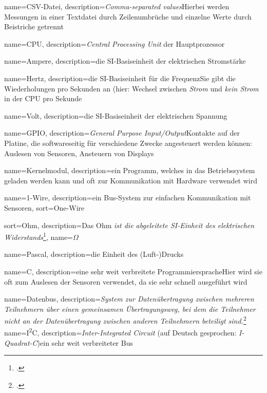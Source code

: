 {
  name=CSV-Datei,
  description={\textit{Comma-separated values}\newline Hierbei werden Messungen in einer Textdatei durch Zeilenumbrüche und einzelne Werte durch Beistriche getrennt}
}

{
  name=CPU,
  description={\textit{Central Processing Unit}\newline
  	der Hauptprozessor}
}

{
  name=Ampere,
  description={die SI-Basiseinheit der elektrischen Stromstärke}
}

{
  name=Hertz,
  description={die SI-Basiseinheit für die Frequenz\newline Sie gibt die Wiederholungen pro Sekunden an (hier: Wechsel zwischen \emph{Strom} und \emph{kein Strom} in der \gls{CPU} pro Sekunde}
}

{
  name=Volt,
  description={die SI-Basiseinheit der elektrischen Spannung}
}

{
  name=GPIO,
  description={\emph{General Purpose Input/Output}\newline Kontakte auf der \gls{Platine}, die softwareseitig für verschiedene Zwecke angesteuert werden können\newline \zB: Auslesen von Sensoren, Ansteuern von Displays}
}

{
  name=Kernelmodul,
  description={ein Programm, welches in das Betriebssystem geladen werden kann und oft zur Kommunikation mit Hardware verwendet wird}
}

{
  name=1-Wire,
  description={ein \gls{Bus}-System zur einfachen Kommunikation mit Sensoren},
  sort=One-Wire
}

{
  sort=Ohm,
  description={Das Ohm \emph{ist die abgeleitete SI-Einheit des elektrischen Widerstands}\footcite{wiki:ohm}},
  name={\ensuremath{\Omega}}
}

{
  name=Pascal,
  description={die Einheit des (Luft-)Drucks}
}


{
  name=C,
  description={eine sehr weit verbreitete Programmiersprache\newline Hier wird sie oft zum Auslesen der Sensoren verwendet, da sie sehr schnell ausgeführt wird}
}

{
  name=Datenbus,
  description={\emph{System zur Datenübertragung zwischen mehreren Teilnehmern über einen gemeinsamen Übertragungsweg, bei dem die Teilnehmer nicht an der Datenübertragung zwischen anderen Teilnehmern beteiligt sind.}\footcite{wiki:bus}}
}
{
  name=I\textsuperscript{2}C,
  description={\textit{Inter-Integrated Circuit} (auf Deutsch gesprochen: \textit{I-Quadrat-C})\newline ein sehr weit verbreiteter \gls{Bus}}
}

